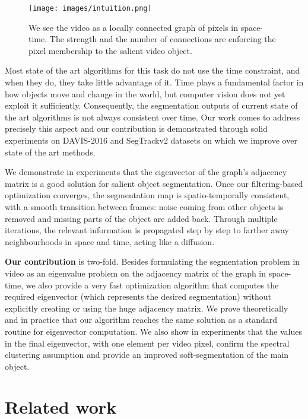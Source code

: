 \documentclass{article}
\begin{document}
\begin{figure}[h]
	\begin{center}
		\texttt{[image: images/intuition.png]}
	\end{center}
	\caption{We see the video as a locally connected graph of pixels in space-time. The strength and the number of connections are enforcing the pixel membership to the salient video object.}
	\label{fig: intuition}
\end{figure}


Most state of the art algorithms for this task do not use the time constraint, and when they do, they take little advantage of it. Time plays a fundamental factor in how objects move and change in the world, but computer vision does not yet exploit it sufficiently. Consequently, the segmentation outputs of current state of the art algorithms is not always consistent over time. Our work comes to address precisely this aspect and our contribution is demonstrated through solid experiments on DAVIS-2016 and SegTrackv2 datasets on which we improve over state of the art methods.

We demonstrate in experiments that the eigenvector of the graph's adjacency matrix is a good solution for salient object segmentation. Once our filtering-based optimization converges, the segmentation map is spatio-temporally consistent, with a smooth transition between frames: noise coming from other objects is removed and missing parts of the object are added back. Through multiple iterations, the relevant information is propagated step by step to farther away neighbourhoods in space and time, acting like a diffusion.


\textbf{Our contribution} is two-fold. Besides formulating the segmentation problem in video as an eigenvalue problem on the adjacency matrix of the graph in space-time, we also provide a very fast optimization algorithm that computes the required eigenvector (which represents the desired segmentation) without explicitly creating or using the huge adjacency matrix. We prove theoretically and in practice that our algorithm reaches the same solution as a standard routine for eigenvector computation. We also show in experiments that the values in the final eigenvector, with one element per video pixel, confirm the spectral clustering assumption and provide an improved soft-segmentation of the main object. 

\section{Related work}
\label{sec: related_work}
\end{document}

